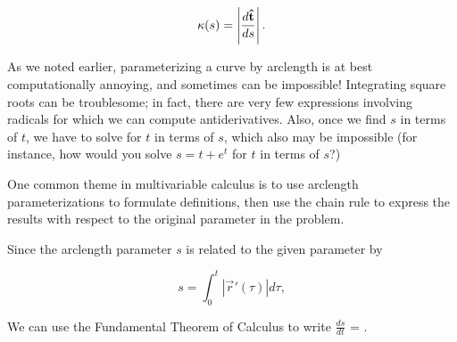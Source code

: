 \documentclass{ximera}
\begin{document}
\begin{exercise}
\begin{exercise}
\begin{exercise}
\begin{exercise}
\begin{definition}
\[ 
\kappa(s) = \left| \frac{d \mathbf{\hat{t}}}{ds} \right|.
\]

\end{definition}



%
%
%
%
%
%
%
%
%
%
   
As we noted earlier, parameterizing a curve by arclength is at best computationally annoying, and sometimes can be impossible!  Integrating square roots can be troublesome; in fact, there are very few expressions involving radicals for which we can compute antiderivatives.  Also, once we find $s$ in terms of $t$, we have to solve for $t$ in terms of $s$, which also may be impossible (for instance, how would you solve $s= t +e^t$ for $t$ in terms of $s$?)

One common theme in multivariable calculus is to use arclength parameterizations to formulate definitions, then use the chain rule to express the results with respect to the original parameter in the problem. 

Since the arclength parameter $s$ is related to the given parameter by 

\[
s = \int^t_0 \left| \vec{r}  '(\tau) \right|  d \tau,\]

We can use the Fundamental Theorem of Calculus to write $\frac{ds}{dt}$ = .


\end{exercise}
\end{exercise}
\end{exercise}
\end{exercise}
\end{document}
